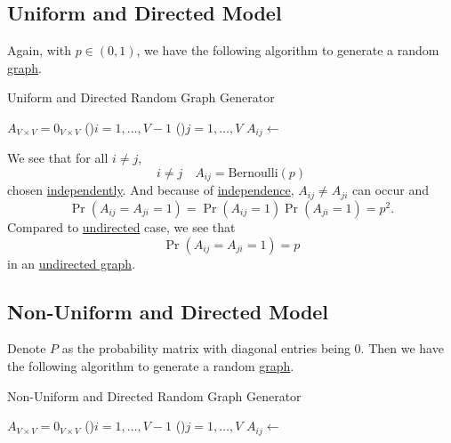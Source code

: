 \subsection{Uniform and Directed Model}\label{subsec:uniform-and-directed-model}
Again, with \(p\in(0, 1)\), we have the following algorithm to generate a random \hyperref[def:graph]{graph}.
\par
\begin{algorithm}[H]\label{algo:uniform-and-directed-model-algo}
	\DontPrintSemicolon
	\caption{Uniform and Directed Random Graph Generator}
	\BlankLine

	\(A_{V\times V} = 0_{V \times V}\) 
	\;
	\For(){\(i= 1, \ldots  , V-1\)}{
		\For(){\(j=1, \ldots  , V\)}{
			\(A_{ij} \gets \)
		}
	}
	\;
\end{algorithm}

We see that for all \(i \neq j\),
\[
	i\neq j\quad A_{ij}= \mathrm{Bernoulli}(p)
\]
chosen \hyperref[def:independent]{independently}. And because of \hyperref[def:independent]{independence},
\(A_{ij}\neq A_{ji}\) can occur and
\[
	\Pr(A_{ij} = A_{ji} = 1) = \Pr(A_{ij} = 1) \Pr( A_{ji} = 1) = p^2.
\]
Compared to \hyperref[subsec:Uniform-and-Undirected-model]{undirected} case, we see that
\[
	\Pr(A_{ij} = A_{ji} = 1) = p
\]
in an \hyperref[def:undirected-graph]{undirected graph}.

\subsection{Non-Uniform and Directed Model}\label{subsec:non-uniform-and-directed-model}
Denote \(P\) as the probability matrix with diagonal entries being \(0\). Then we have the following algorithm to
generate a random \hyperref[def:graph]{graph}.

\par
\begin{algorithm}[H]\label{algo:non-uniform-and-directed-model-algo}
	\DontPrintSemicolon
	\caption{Non-Uniform and Directed Random Graph Generator}
	\BlankLine

	\(A_{V\times V} = 0_{V \times V}\) 
	\;
	\For(){\(i= 1, \ldots  , V-1\)}{
	\For(){\(j= 1, \ldots  , V\)}{
	\(A_{ij} \gets \)
	}
	}
	\;
\end{algorithm}

